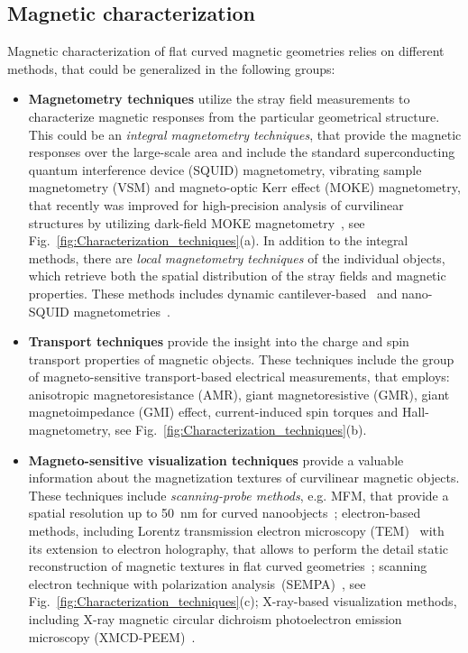 \subsection{Magnetic characterization}

Magnetic characterization of flat curved magnetic geometries relies on different methods, that could be generalized in the following groups:
\begin{itemize}
	\item \textbf{Magnetometry techniques} utilize the stray field measurements to characterize magnetic responses from the particular geometrical structure. This could be an \textit{integral magnetometry techniques}, that provide the magnetic responses over the large-scale area and include the standard superconducting quantum interference device (SQUID) magnetometry, vibrating sample magnetometry (VSM) and magneto-optic Kerr effect (MOKE) magnetometry, that recently was improved for high-precision analysis of curvilinear structures by utilizing dark-field MOKE magnetometry~\cite{Sanz-Hernandez17}, see Fig.~\ref{fig:Characterization_techniques}(a). In addition to the integral methods, there are \textit{local magnetometry techniques} of the individual objects, which retrieve both the spatial distribution of the stray fields and magnetic properties. These methods includes dynamic cantilever-based~\cite{Degen09,Weber12,Mehlin18,Braakman19} and nano-SQUID magnetometries~\cite{Vasyukov18}.
	\item \textbf{Transport techniques} provide the insight into the charge and spin transport properties of magnetic objects. These techniques include the group of magneto-sensitive transport-based electrical measurements, that employs: anisotropic magnetoresistance (AMR), giant magnetoresistive (GMR), giant magnetoimpedance (GMI) effect, current-induced spin torques and Hall-magnetometry, see Fig.~\ref{fig:Characterization_techniques}(b).
	\item \textbf{Magneto-sensitive visualization techniques} provide a valuable information about the magnetization textures of curvilinear magnetic objects. These techniques include \textit{scanning-probe methods}, e.g. MFM, that provide a spatial resolution up to 50~nm for curved  nanoobjects~\cite{Albrecht12,Nguyen15,Streubel16,Ball17,May19}; electron-based methods, including Lorentz transmission electron microscopy (TEM)~\cite{Phatak11,Phatak12,Nord19} with its extension to electron holography, that allows to perform the detail static reconstruction of magnetic textures in flat curved geometries~\cite{Klaeui05,Nord19}; scanning electron technique with polarization analysis~(SEMPA)~\cite{Klaui05,Schoenke18,Schoenke20}, see Fig.~\ref{fig:Characterization_techniques}(c); X-ray-based visualization methods, including X-ray magnetic circular dichroism photoelectron emission microscopy (XMCD-PEEM)~\cite{Streubel15c,Streubel15,Streubel16,Volkov19,Volkov19c}.   

\end{itemize}
